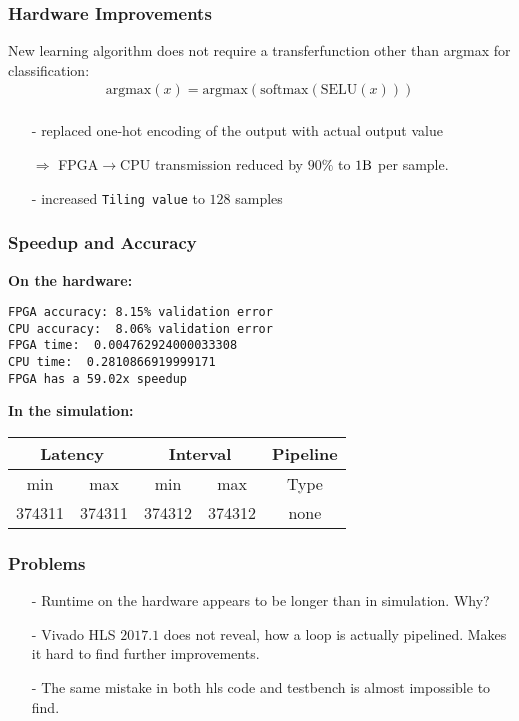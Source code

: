 \documentclass{beamer}
\begin{document}
\begin{frame}
\frametitle{Hardware Improvements}
New learning algorithm does not require a transferfunction other than argmax for classification:
\begin{align*}
		\text{argmax}(x) = \text{argmax}(\text{softmax}(\text{SELU}(x))) \\
\end{align*}
	\begin{itemize}
		\item[-] replaced one-hot encoding of the output with actual output value
		\item[$\Rightarrow$] FPGA$\rightarrow$CPU transmission reduced by $90\si{\percent}$ to $1\si{\byte}$ per sample. 
		\item[-] increased \texttt{Tiling value} to $128$ samples
	\end{itemize}
\end{frame}

\begin{frame}[fragile]
	\frametitle{Speedup and Accuracy}
	\textbf{On the hardware:}
\begin{lstlisting}
FPGA accuracy: 8.15% validation error
CPU accuracy:  8.06% validation error
FPGA time:  0.004762924000033308
CPU time:  0.2810866919999171
FPGA has a 59.02x speedup 
\end{lstlisting}
\textbf{In the simulation:}\\
\vspace{0.5cm}
    \begin{tabular}{ccccc}
        \multicolumn{2}{c}{Latency} & \multicolumn{2}{c}{Interval} & Pipeline\\
        \hline
        min  &   max  &   min  &   max  &   Type  \\
	    374311&  374311&  374312&  374312&   none  
    \end{tabular}


\end{frame}

\begin{frame}
\frametitle{Problems}
\begin{itemize}
	\item[-] Runtime on the hardware appears to be longer than in simulation. Why?
	\item[-] Vivado HLS $2017.1$ does not reveal, how a loop is actually pipelined. Makes it hard to find further improvements.
	\item[-] The same mistake in both hls code and testbench is almost impossible to find.
\end{itemize}

\end{frame}
\end{document}

